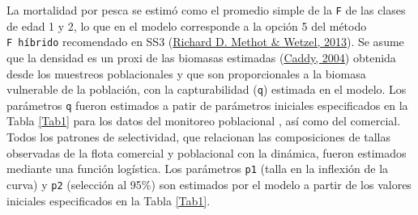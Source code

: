 \documentclass[
]{article}
\begin{document}
La mortalidad por pesca se estimó como el promedio simple de la \texttt{F} de las clases de edad 1 y 2, lo que en el modelo corresponde a la opción 5 del método \texttt{F\ híbrido} recomendado en SS3 (\protect\hyperlink{ref-Methot2013}{Richard D. Methot \& Wetzel, 2013}). Se asume que la densidad es un proxi de las biomasas estimadas (\protect\hyperlink{ref-Caddy2004}{Caddy, 2004}) obtenida desde los muestreos poblacionales y que son proporcionales a la biomasa vulnerable de la población, con la capturabilidad (\texttt{q}) estimada en el modelo. Los parámetros \texttt{q} fueron estimados a patir de parámetros iniciales especificados en la Tabla \ref{Tab1} para los datos del monitoreo poblacional , así como del comercial. Todos los patrones de selectividad, que relacionan las composiciones de tallas observadas de la flota comercial y poblacional con la dinámica, fueron estimados mediante una función logística. Los parámetros \texttt{p1} (talla en la inflexión de la curva) y \texttt{p2} (selección al 95\%) son estimados por el modelo a partir de los valores iniciales especificados en la Tabla \ref{Tab1}.
\end{document}
